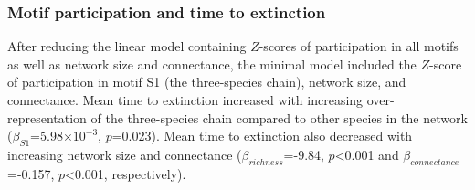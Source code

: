 \documentclass[12pt]{article}
\begin{document}
		\subsubsection*{Motif participation and time to extinction}

			After reducing the linear model containing $Z$-scores of participation in all motifs as well as network size and connectance, the minimal model included the $Z$-score of participation in motif S1 (the three-species chain), network size, and connectance. Mean time to extinction increased with increasing over-representation of the three-species chain compared to other species in the network ($\beta_{S1}$=5.98$\times10^{-3}$, $p$=0.023). Mean time to extinction also decreased with increasing network size and connectance ($\beta_{richness}$=-9.84, $p$\textless0.001 and $\beta_{connectance}$=-0.157, $p$\textless0.001, respectively).












\end{document}
